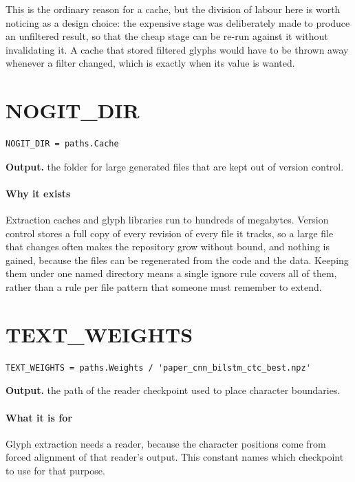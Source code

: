This is the ordinary reason for a cache, but the division of labour here is worth noticing as a design choice: the expensive stage was deliberately made to produce an unfiltered result, so that the cheap stage can be re-run against it without invalidating it. A cache that stored filtered glyphs would have to be thrown away whenever a filter changed, which is exactly when its value is wanted.


\section{NOGIT\_DIR}
\begin{lstlisting}[style=sig]
NOGIT_DIR = paths.Cache
\end{lstlisting}

\noindent\textbf{Output.} the folder for large generated files that are kept out of version control.


\paragraph{Why it exists}
Extraction caches and glyph libraries run to hundreds of megabytes. Version control stores a full copy of every revision of every file it tracks, so a large file that changes often makes the repository grow without bound, and nothing is gained, because the files can be regenerated from the code and the data. Keeping them under one named directory means a single ignore rule covers all of them, rather than a rule per file pattern that someone must remember to extend.


\section{TEXT\_WEIGHTS}
\begin{lstlisting}[style=sig]
TEXT_WEIGHTS = paths.Weights / 'paper_cnn_bilstm_ctc_best.npz'
\end{lstlisting}

\noindent\textbf{Output.} the path of the reader checkpoint used to place character boundaries.


\paragraph{What it is for}
Glyph extraction needs a reader, because the character positions come from forced alignment of that reader's output. This constant names which checkpoint to use for that purpose.


